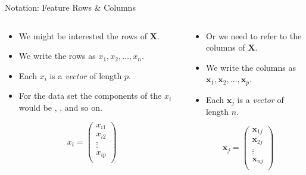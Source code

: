 \documentclass[mathserif, aspectratio=169]{beamer}
\begin{document}
\begin{frame}{Notation: Feature Rows \& Columns}
	\vspace{-3mm}
	\begin{columns}[t]
		\begin{column}{0.5\textwidth}
			\begin{itemize}
				\item We might be interested the rows of $\bm{X}$.
				\item We write the rows as $x_1, x_2, \dots, x_n$.
				\item Each $x_i$ is a \emph{vector} of length $p$. 
				\item For the  data set the components of the $x_i$
					would be , ,  and so on.
			\end{itemize}
			\vspace{-12mm}
			\begin{center}
				\[
					x_i =
					\begin{pmatrix}
						x_{i1} \\
						x_{i2} \\
						\vdots \\
						x_{ip} \\
					\end{pmatrix}
				\]
			\end{center}
		\end{column}
		\begin{column}{0.5\textwidth}
			\begin{itemize}
				\item Or we need to refer to the columns of $\bm{X}$.
				\item We write the columns as $\bm{x}_1, \bm{x}_2, \dots, \bm{x}_p$.
				\item Each $\bm{x}_j$ is a \emph{vector} of length $n$. 
			\end{itemize}
			\vspace{2mm}
			\begin{center}
				\[
					\bm{x}_j =
					\begin{pmatrix}
						\bm{x}_{1j} \\
						\bm{x}_{2j} \\
						\vdots \\
						\bm{x}_{nj} \\
					\end{pmatrix}
				\]
			\end{center}
		\end{column}
	\end{columns}
\end{frame}
\end{document}
